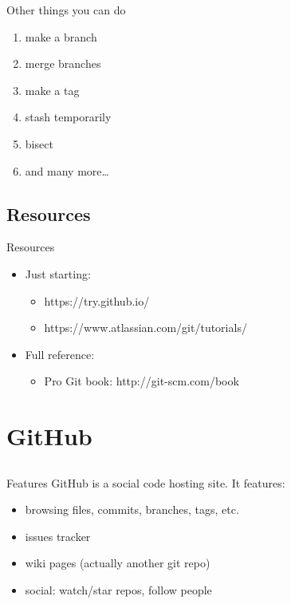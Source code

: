 \documentclass{beamer}
\begin{document}
\begin{frame}{Other things you can do}
  \begin{enumerate}
    \item make a branch
    \item merge branches
    \item make a tag
    \item stash temporarily
    \item bisect
    \item and many more\ldots
  \end{enumerate}
\end{frame}

\subsection{Resources}
\begin{frame}{Resources}
  \begin{itemize}
    \item Just starting:
      \begin{itemize}
        \item https://try.github.io/
        \item https://www.atlassian.com/git/tutorials/
      \end{itemize}
    \item Full reference:
      \begin{itemize}
        \item Pro Git book: http://git-scm.com/book
      \end{itemize}
  \end{itemize}
\end{frame}

\section{GitHub}
\subsection*{}

\begin{frame}{Features}
GitHub is a social code hosting site. It features:
  \begin{itemize}
    \item browsing files, commits, branches, tags, etc.
    \item issues tracker
    \item wiki pages (actually another git repo)
    \item social: watch/star repos, follow people
  \end{itemize}
\end{frame}
\end{document}
